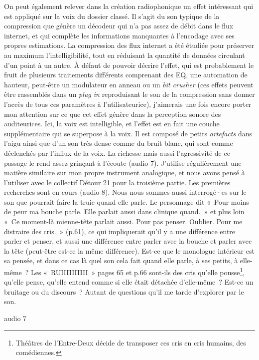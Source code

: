\documentclass[
]{article}
\begin{document}
On peut également relever dans la création radiophonique un effet intéressant qui est appliqué sur la voix du dossier classé. Il s'agit du son typique de la compression que génère un décodeur qui n'a pas assez de débit dans le flux internet, et qui complète les informations manquantes à l'encodage avec ses propres estimations. La compression des flux internet a été étudiée pour préserver au maximum l'intelligibilité, tout en réduisant la quantité de données circulant d'un point à un autre. À défaut de pouvoir décrire l'effet, qui est probablement le fruit de plusieurs traitements différents comprenant des EQ, une automation de hauteur, peut-être un modulateur en anneau ou un \emph{bit crusher} (ces effets peuvent être rassemblés dans un \emph{plug in} reproduisant le son de la compression sans donner l'accès de tous ces paramètres à l'utilisateurice), j'aimerais une fois encore porter mon attention sur ce que cet effet génère dans la perception sonore des auditeurices. Ici, la voix est intelligible, et l'effet est en fait une couche supplémentaire qui se superpose à la voix. Il est composé de petits \emph{artefacts} dans l'aigu ainsi que d'un son très dense comme du bruit blanc, qui sont comme déclenchés par l'influx de la voix. La richesse mais aussi l'agressivité de ce passage le rend assez grinçant à l'écoute (audio 7). J'utilise régulièrement une matière similaire sur mon propre instrument analogique, et nous avons pensé à l'utiliser avec le collectif Détour 21 pour la troisième partie. Les premières recherches sont en cours (audio 8). Nous nous sommes aussi interrogé·es sur le son que pourrait faire la truie quand elle parle. Le personnage dit «~Pour moins de peur ma bouche parle. Elle parlait aussi dans clinique quand.~» et plus loin «~Ce moment-là mienne-tête parlait aussi. Pour pas penser. Oublier. Pour me distraire des cris.~» (p.61), ce qui impliquerait qu'il y a une différence entre parler et penser, et aussi une différence entre parler avec la bouche et parler avec la tête (peut-être est-ce la même différence). Est-ce que le monologue intérieur est sa pensée, et dans ce cas là quel son cela fait quand elle parle, à ses petits, à elle-même~? Les «~RUIIIIIIIIII~» pages 65 et p.66 sont-ils des cris qu'elle pousse\footnote{Théâtres de l'Entre-Deux décide de transposer ces cris en cris humains, des comédiennes.}, qu'elle pense, qu'elle entend comme si elle était détachée d'elle-même~? Est-ce un bruitage ou du discours~? Autant de questions qu'il me tarde d'explorer par le son.

audio 7
\end{document}
